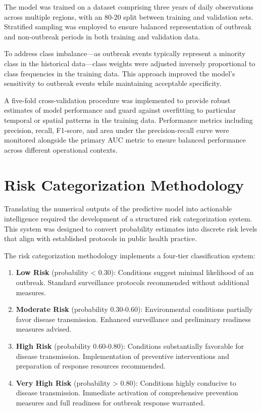 \documentclass[12pt,a4paper]{report}
\begin{document}
The model was trained on a dataset comprising three years of daily observations across multiple regions, with an 80-20 split between training and validation sets. Stratified sampling was employed to ensure balanced representation of outbreak and non-outbreak periods in both training and validation data.

To address class imbalance—as outbreak events typically represent a minority class in the historical data—class weights were adjusted inversely proportional to class frequencies in the training data. This approach improved the model's sensitivity to outbreak events while maintaining acceptable specificity.

A five-fold cross-validation procedure was implemented to provide robust estimates of model performance and guard against overfitting to particular temporal or spatial patterns in the training data. Performance metrics including precision, recall, F1-score, and area under the precision-recall curve were monitored alongside the primary AUC metric to ensure balanced performance across different operational contexts.

\section{Risk Categorization Methodology}
Translating the numerical outputs of the predictive model into actionable intelligence required the development of a structured risk categorization system. This system was designed to convert probability estimates into discrete risk levels that align with established protocols in public health practice.

The risk categorization methodology implements a four-tier classification system:

\begin{enumerate}
    \item \textbf{Low Risk} (probability < 0.30): Conditions suggest minimal likelihood of an outbreak. Standard surveillance protocols recommended without additional measures.
    
    \item \textbf{Moderate Risk} (probability 0.30-0.60): Environmental conditions partially favor disease transmission. Enhanced surveillance and preliminary readiness measures advised.
    
    \item \textbf{High Risk} (probability 0.60-0.80): Conditions substantially favorable for disease transmission. Implementation of preventive interventions and preparation of response resources recommended.
    
    \item \textbf{Very High Risk} (probability > 0.80): Conditions highly conducive to disease transmission. Immediate activation of comprehensive prevention measures and full readiness for outbreak response warranted.
\end{enumerate}
\end{document}
